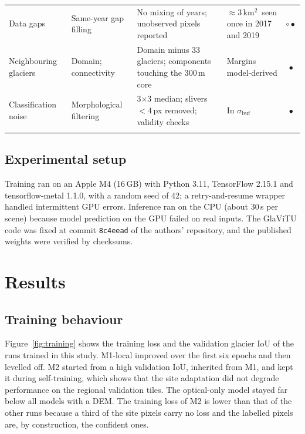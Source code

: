 \documentclass[pdflatex,sn-mathphys-num]{sn-jnl}%
\theoremstyle{thmstyleone}%
\theoremstyle{thmstyletwo}%
\theoremstyle{thmstylethree}%
\newcommand{\kmsq}{km$^2$}
\begin{document}
\begin{table}
\begin{tabular*}{\textheight}{@{\extracolsep\fill}p{2.4cm}p{3.0cm}p{6.2cm}p{4.6cm}c}
Data gaps & Same-year gap filling & No mixing of years; unobserved pixels reported & $\approx 3$\,\kmsq\ seen once in 2017 and 2019 & $\circ\!\bullet$ \\
Neighbouring glaciers & Domain; connectivity & Domain minus 33 glaciers; components touching the 300\,m core & Margins model-derived & $\bullet$ \\
Classification noise & Morphological filtering & 3$\times$3 median; slivers $< 4$\,px removed; validity checks & In $\sigma_\mathrm{buf}$ & $\bullet$ \\
\botrule
\end{tabular*}
\end{table}

\subsection{Experimental setup}\label{subsec3.12}

Training ran on an Apple M4 (16\,GB) with Python 3.11, TensorFlow 2.15.1 and tensorflow-metal 1.1.0, with a random seed of 42; a retry-and-resume wrapper handled intermittent GPU errors. Inference ran on the CPU (about 30\,s per scene) because model prediction on the GPU failed on real inputs. The GlaViTU code was fixed at commit \texttt{8c4eead} of the authors' repository, and the published weights were verified by checksums.

\section{Results}\label{sec4}

\subsection{Training behaviour}\label{subsec4.1}

Figure~\ref{fig:training} shows the training loss and the validation glacier IoU of the runs trained in this study. M1-local improved over the first six epochs and then levelled off. M2 started from a high validation IoU, inherited from M1, and kept it during self-training, which shows that the site adaptation did not degrade performance on the regional validation tiles. The optical-only model stayed far below all models with a DEM. The training loss of M2 is lower than that of the other runs because a third of the site pixels carry no loss and the labelled pixels are, by construction, the confident ones.
\end{document}
